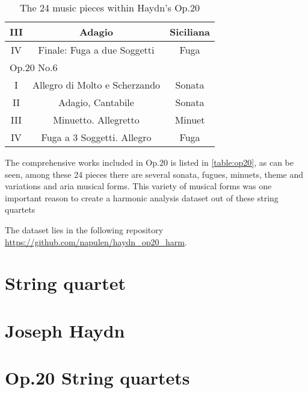 \begin{table}[]
\begin{tabular}{|c|c|c|}
III & Adagio & Siciliana \\ \hline
IV & Finale: Fuga a due Soggetti & Fuga \\ \hline
\multicolumn{3}{|l|}{Op.20 No.6} \\ \hline
I & Allegro di Molto e Scherzando & Sonata \\ \hline
II & Adagio, Cantabile & Sonata \\ \hline
III & Minuetto. Allegretto & Minuet \\ \hline
IV & Fuga a 3 Soggetti. Allegro & Fuga \\ \hline
\end{tabular}
\caption{The 24 music pieces within Haydn's Op.20}
\label{table:op20}
\end{table}


The comprehensive works included in Op.20 is listed in \autoref{table:op20}, as can be seen, among these 24 pieces there are several sonata, fugues, minuets, theme and variations and aria musical forms. This variety of musical forms was one important reason to create a harmonic analysis dataset out of these string quartets



The dataset lies in the following repository \url{https://github.com/napulen/haydn_op20_harm}.

\section{String quartet}

\section{Joseph Haydn}

\section{Op.20 String quartets}

\newpage
